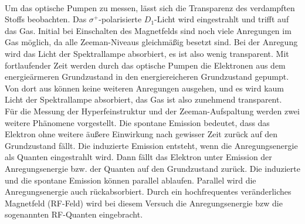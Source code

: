 %
\\Um das optische Pumpen zu messen, lässt sich die Transparenz des verdampften Stoffs beobachten.
Das $\sigma^{+}$-polarisierte $D_{1}$-Licht wird eingestrahlt und trifft auf das Gas.
Initial bei Einschalten des Magnetfelds sind noch viele Anregungen im Gas möglich, da alle Zeeman-Niveaus gleichmäßig besetzt sind.
Bei der Anregung wird das Licht der Spektrallampe absorbiert, es ist also wenig transparent.
Mit fortlaufender Zeit werden durch das optische Pumpen die Elektronen aus dem energieärmeren Grundzustand in den energiereicheren Grundzustand gepumpt.
Von dort aus können keine weiteren Anregungen ausgehen, und es wird kaum Licht der Spektrallampe absorbiert, das Gas ist also zunehmend transparent.
%
%
\\Für die Messung der Hyperfeinstruktur und der Zeeman-Aufspaltung werden zwei weitere Phänomene vorgestellt.
Die spontane Emission bedeutet, dass das Elektron ohne weitere äußere Einwirkung nach gewisser Zeit zurück auf den Grundzustand fällt.
Die induzierte Emission entsteht, wenn die Anregungsenergie als Quanten eingestrahlt wird.
Dann fällt das Elektron unter Emission der Anregungsenergie bzw. der Quanten auf den Grundzustand zurück.
Die induzierte und die spontane Emission können parallel ablaufen.
Parallel wird die Anregungsenergie auch rückabsorbiert.
Durch ein hochfrequentes veränderliches Magnetfeld (RF-Feld) wird bei diesem Versuch die Anregungsenergie bzw die sogenannten RF-Quanten eingebracht.
